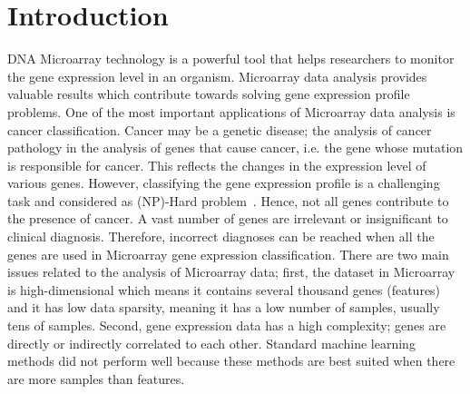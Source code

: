 \documentclass[runningheads]{llncs}
\begin{document}
\section{Introduction}

DNA Microarray technology is a powerful tool that helps researchers to monitor the gene expression level in an organism. Microarray data analysis provides valuable results which contribute towards solving gene expression profile problems. One of the most important applications of Microarray data analysis is cancer classification. Cancer may be a genetic disease; the analysis of cancer pathology in the analysis of genes that cause cancer, i.e. the gene whose mutation is responsible for cancer. This reflects the changes in the expression level of various genes. However, classifying the gene expression profile is a challenging task and considered as (NP)-Hard problem~\cite{narendra1977branch}. Hence, not all genes contribute to the presence of cancer. A vast number of genes are irrelevant or insignificant to clinical diagnosis. Therefore, incorrect diagnoses can be reached when all the genes are used in Microarray gene expression classification. There are two main issues related to the analysis of Microarray data; first, the dataset in Microarray is high-dimensional which means it contains several thousand genes (features) and it has low data sparsity, meaning it has a low number of samples, usually tens of samples. Second, gene expression data has a high complexity; genes are directly or indirectly correlated to each other. Standard machine learning methods did not perform well because these methods are best suited when there are more samples than features.
\end{document}
